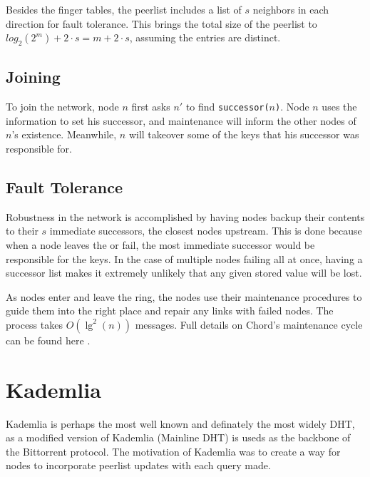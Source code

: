 \documentclass[10pt,letterpaper,twoside]{report}
\begin{document}
Besides the finger tables, the peerlist includes a list of $s$ neighbors in each direction for fault tolerance.
This brings the total size of the peerlist to $log_{2}(2^{m})  + 2 \cdot s =  m  + 2 \cdot s$, assuming the entries are distinct.

\subsection*{Joining}
To join the network, node $n$ first asks $n'$ to find \texttt{successor($ n $)}. 
Node $n$ uses the information to set his successor, and maintenance will inform the other nodes of $n$'s existence.
Meanwhile, $n$ will takeover some of the keys that his successor was responsible for.

\subsection*{Fault Tolerance}
Robustness in the network is accomplished by having nodes backup their contents to their $s$ immediate successors, the closest nodes upstream. 
This is done because when a node leaves the or fail, the most immediate successor would be responsible for the keys.
In the case of multiple nodes failing all at once, having a successor list makes it extremely unlikely that any given stored value will be lost.

As nodes enter and leave the ring, the nodes use their maintenance procedures to guide them into the right place and repair any links with failed nodes.  
The process takes $O(\lg^{2}(n))$ messages.
Full details on Chord's maintenance cycle can be found here \cite{chord}.






\section{Kademlia}
Kademlia \cite{kademlia}  is perhaps the most well known and definately the most widely DHT, as a modified version of Kademlia (Mainline DHT) is useds as the backbone of the Bittorrent protocol.
The motivation of Kademlia was to create a way for nodes to incorporate peerlist updates with each query made.
\end{document}
